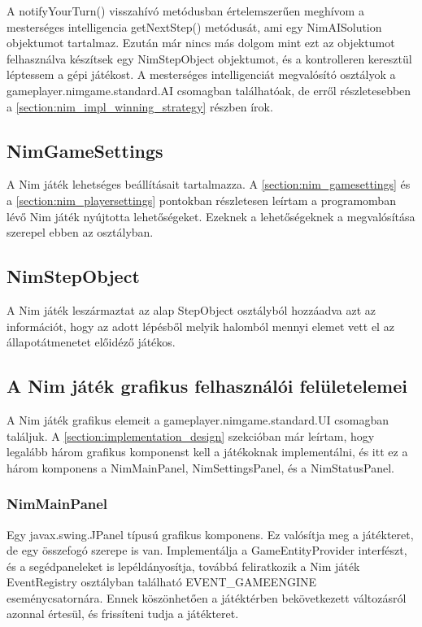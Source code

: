 A notifyYourTurn() visszahívó metódusban értelemszerűen meghívom a mesterséges intelligencia getNextStep() metódusát, ami egy NimAISolution objektumot tartalmaz. Ezután már nincs más dolgom mint ezt az objektumot felhasználva készítsek egy NimStepObject objektumot, és a kontrolleren keresztül léptessem a gépi játékost. A mesterséges intelligenciát megvalósító osztályok a gameplayer.nimgame.standard.AI csomagban találhatóak, de erről részletesebben a \ref*{section:nim_impl_winning_strategy} részben írok.

\subsection{NimGameSettings}
A Nim játék lehetséges beállításait tartalmazza. A \ref*{section:nim_gamesettings} és a \ref*{section:nim_playersettings} pontokban részletesen leírtam a programomban lévő Nim játék nyújtotta lehetőségeket. Ezeknek a lehetőségeknek a megvalósítása szerepel ebben az osztályban.

\subsection{NimStepObject}
A Nim játék leszármaztat az alap StepObject osztályból hozzáadva azt az információt, hogy az adott lépésből melyik halomból mennyi elemet vett el az állapotátmenetet előidéző játékos.

\subsection{A Nim játék grafikus felhasználói felületelemei}
A Nim játék grafikus elemeit a gameplayer.nimgame.standard.UI csomagban találjuk. A \ref*{section:implementation_design} szekcióban már leírtam, hogy legalább három grafikus komponenst kell a játékoknak implementálni, és itt ez a három komponens a NimMainPanel, NimSettingsPanel, és a NimStatusPanel.

\subsubsection{NimMainPanel}
Egy javax.swing.JPanel típusú grafikus komponens. Ez valósítja meg a játékteret, de egy összefogó szerepe is van. Implementálja a GameEntityProvider interfészt, és a segédpaneleket is lepéldányosítja, továbbá feliratkozik a Nim játék EventRegistry osztályban található EVENT\_GAMEENGINE eseménycsatornára. Ennek köszönhetően a játéktérben bekövetkezett változásról azonnal értesül, és frissíteni tudja a játékteret.

